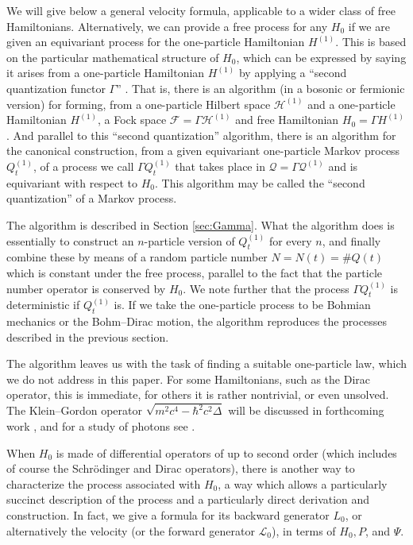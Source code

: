 \documentclass[12pt]{article}
\newcommand{\1}{\mathbf{1}} %
\newcommand{\Laplace}{\Delta} %
\newcommand{\Hilbert}{\mathscr{H}}
\newcommand{\Fock}{\mathscr{F}} %
\newcommand{\conf}{\mathcal{Q}} %
\newcommand{\generator}{\mathscr{L}} %
\newcommand{\pov}{{P}}%
\begin{document}
We will give below a general velocity formula, applicable to a wider
class of free Hamiltonians.  Alternatively, we can provide a free
process for any $H_0$ if we are given an equivariant process for the
one-particle Hamiltonian $H^{(1)}$.  This is based on the particular
mathematical structure of $H_0$, which can be expressed by saying it
arises from a one-particle Hamiltonian $H^{(1)}$ by applying a
``second quantization functor $\Gamma$'' \cite{RS}. That is, there is
an algorithm (in a bosonic or fermionic version) for forming, from a
one-particle Hilbert space $\Hilbert^{(1)}$ and a one-particle
Hamiltonian $H^{(1)}$, a Fock space $\Fock = \Gamma\Hilbert^{(1)}$ and
free Hamiltonian $H_0 = \Gamma H^{(1)}$.  And parallel to this
``second quantization'' algorithm, there is an algorithm for the
canonical construction, from a given equivariant one-particle Markov
process $Q^{(1)}_t$, of a process we call $\Gamma Q^{(1)}_t$ that
takes place in $\conf = \Gamma \conf^{(1)}$ and is equivariant with
respect to $H_0$.  This algorithm may be called the ``second
quantization'' of a Markov process.

The algorithm is described in Section \ref{sec:Gamma}.  What the
algorithm does is essentially to construct an $n$-particle version of
$Q^{(1)}_t$ for every $n$, and finally combine these by means of a
random particle number $N = N(t) = \# Q(t)$ which is constant under
the free process, parallel to the fact that the particle number
operator is conserved by $H_0$. We note further that the process
$\Gamma Q^{(1)}_t$ is deterministic if $Q^{(1)}_t$ is.  If we take the
one-particle process to be Bohmian mechanics or the Bohm--Dirac
motion, the algorithm reproduces the processes described in the
previous section.

The algorithm leaves us with the task of finding a suitable
one-particle law, which we do not address in this paper. For some
Hamiltonians, such as the Dirac operator, this is immediate, for
others it is rather nontrivial, or even unsolved. The Klein--Gordon
operator $\sqrt{m^2c^4 - \hbar^2c^2\Laplace}$ will be discussed in
forthcoming work \cite{klein2}, and for a study of photons see
\cite{photon}.

When $H_0$ is made of differential operators of up to second order
(which includes of course the Schr\"odinger and Dirac operators),
there is another way to characterize the process associated with
$H_0$, a way which allows a particularly succinct description of the
process and a particularly direct derivation and construction.  In
fact, we give a formula for its backward generator $L_0$, or
alternatively the velocity (or the forward generator $\generator_0$),
in terms of $H_0,\pov$, and $\Psi$.
\end{document}
